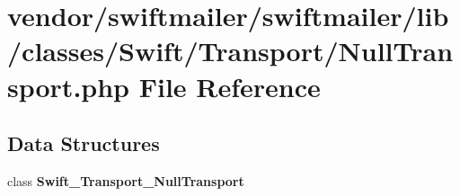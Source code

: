 \section{vendor/swiftmailer/swiftmailer/lib/classes/\+Swift/\+Transport/\+Null\+Transport.php File Reference}
\label{_transport_2_null_transport_8php}
\subsection*{Data Structures}
\begin{DoxyCompactItemize}
\item 
class {\bf Swift\+\_\+\+Transport\+\_\+\+Null\+Transport}
\end{DoxyCompactItemize}
